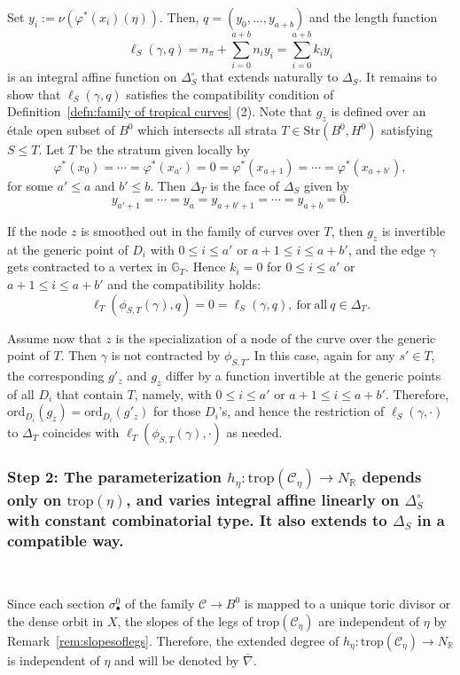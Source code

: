 \documentclass[11pt,reqno]{amsart}
\numberwithin{equation}{section}
\theoremstyle{definition}
\newcommand{\trop}{\mathrm{trop}}
\newcommand{\RR}{{\mathbb R}}
\newcommand{\GG}{{\mathbb G}}
\newcommand{\cC}{{\mathcal{C}}}
\theoremstyle{remark}
\begin{document}
Set $y_i:=\nu\left(\varphi^*(x_i)(\eta)\right)$. Then, $q=(y_0,\dotsc,y_{a+b})$ and the length function
$$\ell_S(\gamma,q)=n_\pi+\sum_{i=0}^{a+b} n_iy_i=\sum_{i=0}^{a+b} k_iy_i$$ 
is an integral affine function on $\Delta_{S}^\circ$ that extends naturally to $\Delta_S$. It remains to show that $\ell_S(\gamma,q)$ satisfies the compatibility condition of Definition~\ref{defn:family of tropical curves} (2). Note that $g_z$ is defined over an \'etale open subset of $B^0$ which intersects all strata $T\in\mathrm{Str}(B^0,H^0)$ satisfying $S\le T$. Let $T$ be the stratum given locally by 
$$\varphi^*(x_0)=\cdots =\varphi^*(x_{a'})=0=\varphi^*(x_{a+1})=\cdots=\varphi^*(x_{a+b'}),$$
for some $a'\leq a$ and $b'\leq b$. Then $\Delta_{T}$ is the face of $\Delta_S$ given by $$y_{a'+1}=\cdots=y_a=y_{a+b'+1}=\cdots=y_{a+b}=0.$$

If the node $z$ is smoothed out in the family of curves over $T$, then $g_z$ is invertible at the generic point of $D_i$ with $0\leq i\leq a'$ or $a+1\leq i\leq a+b'$, and the edge $\gamma$ gets contracted to a vertex in $\GG_{T}$. Hence $k_i=0$ for $0\leq i\leq a'$ or $a+1\leq i\leq a+b'$ and the compatibility holds:
$$\ell_{T}(\phi_{S,T}(\gamma),q)=0=\ell_S(\gamma,q),\ \mathrm{for\ all}\ q\in \Delta_{T}.$$

Assume now that $z$ is the specialization of a node of the curve over the generic point of $T$. Then $\gamma$ is not contracted by $\phi_{S,T}$. In this case, again for any $s'\in T$, the corresponding $g'_z$ and $g_z$ differ by a function invertible at the generic points of all $D_i$ that contain $T$, namely, with $0\leq i\leq a'$ or $a+1\leq i\leq a+b'$. Therefore, $\mathrm{ord}_{D_i}(g_z)=\mathrm{ord}_{D_i}(g'_z)$ for those $D_i$'s, and hence the restriction of $\ell_S(\gamma,\cdot)$ to $\Delta_T$ coincides with $\ell_T(\phi_{S,T}(\gamma),\cdot)$ as needed.


\subsubsection*{Step 2: The parameterization $h_\eta\colon\trop(\cC_\eta)\rightarrow N_\RR$ depends only on $\trop(\eta)$, and varies integral affine linearly on $\Delta_S^\circ$ with constant combinatorial type. It also extends to $\Delta_S$ in a compatible way.}\ 

Since each section $\sigma^0_\bullet$ of the family $\cC\rightarrow B^0$ is mapped to a unique toric divisor or the dense orbit in $X$, the slopes of the legs of $\trop(\cC_\eta)$ are independent of $\eta$ by Remark~\ref{rem:slopesoflegs}. Therefore, the extended degree of $h_\eta\colon\trop(\cC_\eta)\rightarrow N_\RR$ is independent of $\eta$ and will be denoted by $\overline\nabla$.
\end{document}
